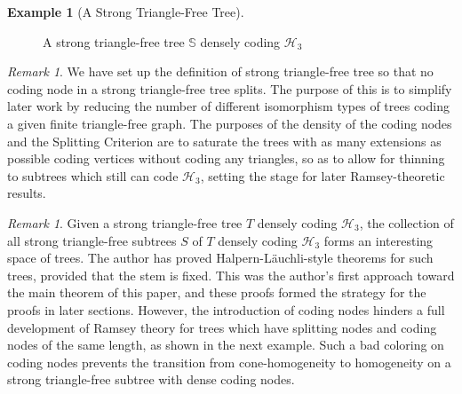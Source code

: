 \documentclass{amsart}
\theoremstyle{remark}
\newtheorem{rem}[thm]{Remark}
\theoremstyle{definition}
\newtheorem{example}[thm]{Example}
\theoremstyle{remark}
\newcommand{\bS}{\mathbb{S}}
\newcommand{\Lauchli}{L{\"{a}}uchli}
\begin{document}
\begin{example}[A Strong Triangle-Free Tree]
\begin{figure}
\caption{A strong triangle-free tree $\bS$ densely coding $\mathcal{H}_3$}
\end{figure}
\end{example}







\begin{rem}\label{rem.properties}
We have set up the definition of strong triangle-free tree so that no coding node in a strong triangle-free tree splits.
The purpose  of this  is to simplify later work by reducing the number of different isomorphism types of trees coding  a given finite triangle-free graph.
The purposes of the density of the coding  nodes  and the Splitting Criterion are to saturate the trees with as many extensions as possible coding vertices without coding any triangles, so as to
allow for  thinning to subtrees which  still can code $\mathcal{H}_3$, setting the stage for later Ramsey-theoretic results.
\end{rem}


\begin{rem}\label{rem.badcoloring}
Given a strong triangle-free tree $T$ densely coding $\mathcal{H}_3$,
the collection of all
 strong triangle-free subtrees  $S$ of $T$ densely coding $\mathcal{H}_3$  forms an interesting space of trees.
The author has  proved
 Halpern-\Lauchli-style  theorems for such trees, provided that the stem is fixed.
This was the author's first approach toward the main theorem of this paper, and these proofs formed the strategy for the proofs in later sections.
However, the introduction of coding nodes hinders a full development of Ramsey theory for trees which have splitting nodes and coding nodes of the same length, as shown in the next example.
Such a bad coloring on coding nodes prevents the transition from cone-homogeneity to homogeneity on a strong triangle-free subtree with dense coding nodes.
\end{rem}
\end{document}

